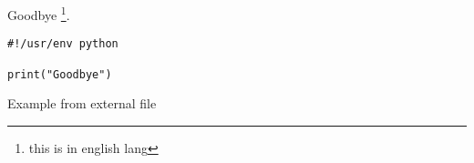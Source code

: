 \documentclass[
paper=a4,
fontsize=12pt,
twoside,
liststotoc, %
toctotoc, %
]{article} %
\begin{document}
Goodbye \footnote{this is in english lang}.

\begin{listing}[ht]
\begin{verbatim}
#!/usr/env python

print("Goodbye")
\end{verbatim}
\caption{Example from external file}
\label{listing:3}
\end{listing}



\appendix


\clearpage
\printglossaries


\end{document}
